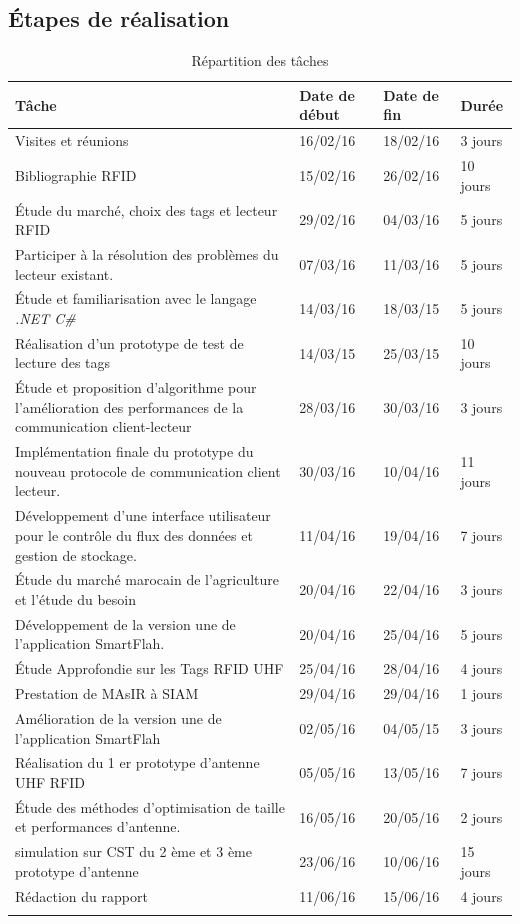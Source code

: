 \documentclass[11pt, a4paper, twoside]{book}
\begin{document}
\subsection{Étapes	de	réalisation}
\begin{longtable}{|p{}|p{}|p{}| p{}|}
\hline
\textbf{Tâche} & \textbf{Date de début} & \textbf{Date de fin} & \textbf{Durée} \\
\hline
Visites et réunions & 16/02/16 & 18/02/16 & 3 jours \\
\hline
Bibliographie RFID & 15/02/16 & 26/02/16 & 10 jours \\
\hline
Étude du marché, choix des tags et lecteur RFID & 29/02/16 & 04/03/16 & 5 jours \\
\hline
Participer à  la résolution des problèmes du lecteur existant.
 & 07/03/16 & 11/03/16 & 5 jours \\
\hline
Étude et familiarisation avec le langage \emph{.NET C\#} & 14/03/16 & 18/03/15 & 5 jours \\
\hline
Réalisation d'un prototype de test de lecture des tags & 14/03/15 & 25/03/15 & 10 jours \\
\hline
 Étude et proposition d'algorithme pour l'amélioration des performances de la communication client-lecteur
 & 28/03/16 & 30/03/16 & 3 jours \\
\hline
Implémentation finale du prototype du nouveau protocole de communication client lecteur.
 & 30/03/16 & 10/04/16 & 11 jours \\
\hline
Développement d'une interface utilisateur pour le contrôle du flux des données et gestion de stockage.
 & 11/04/16 & 19/04/16 & 7 jours \\
\hline
Étude du marché marocain de l'agriculture et l'étude du besoin & 20/04/16 & 22/04/16 & 3 jours \\
\hline
Développement de la version une de l'application SmartFlah. & 20/04/16 & 25/04/16 & 5 jours \\
\hline
Étude Approfondie sur les Tags RFID UHF  & 25/04/16 & 28/04/16 & 4 jours \\
\hline
Prestation de MAsIR à SIAM  & 29/04/16 & 29/04/16 & 1 jours \\
\hline
Amélioration de la version une de l'application SmartFlah & 02/05/16 & 04/05/15 & 3 jours \\
\hline
Réalisation du 1 er prototype d'antenne UHF RFID & 05/05/16 & 13/05/16 & 7 jours \\
\hline
Étude des méthodes d'optimisation de taille et performances d'antenne. & 16/05/16 & 20/05/16 & 2 jours \\
\hline
simulation sur CST du 2 ème et 3 ème prototype d'antenne & 23/06/16 & 10/06/16 & 15 jours \\
\hline
Rédaction du rapport & 11/06/16 & 15/06/16 & 4 jours \\
\hline
\caption{Répartition des tâches}
\end{longtable}
\end{document}
